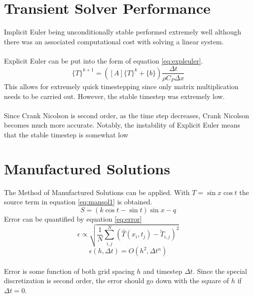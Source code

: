 \documentclass[12pt,twocolumn]{article}
\begin{document}
\section*{Transient Solver Performance}
Implicit Euler being unconditionally stable performed extremely well although there was an associated computational cost with solving a linear system.
\paragraph{}
Explicit Euler can be put into the form of equation \eqref{eq:expleuler}.
\begin{equation}\label{eq:expleuler}\{T\}^{k+1} = ([A]\{T\}^k + \{b\})\frac{\Delta t}{\rho C_P \Delta x}\end{equation}
This allows for extremely quick timestepping since only matrix multiplication needs to be carried out. 
However, the stable timestep was extremely low.
\paragraph{}
Since Crank Nicolson is second order, as the time step decreases, Crank Nicolson becomes much more accurate. 
Notably, the instability of Explicit Euler means that the stable timestep is somewhat low

\section*{Manufactured Solutions}
The Method of Manufactured Solutions can be applied.
With $T=\sin x \cos t$ the source term in equation \eqref{eq:mansol1} is obtained.
\begin{equation}\label{eq:mansol1}S = (k\cos t - \sin t)\sin x - q\end{equation}
Error can be quantified by equation \eqref{eq:error}
\begin{equation}\label{eq:error}\epsilon \propto \sqrt{\frac{1}{N} \sum\limits_{i,j}^N (\hat T (x_i,t_j) - \tilde T_{i,j})^2}\end{equation}
\begin{equation}\epsilon(h,\Delta t) = O(h^2,\Delta t^n)\end{equation}
\paragraph{} Error is some function of both grid spacing $h$ and timestep $\Delta t$. Since the special discretization is second order, the error should go down with the square of $h$ if $\Delta t = 0$.
\end{document}
